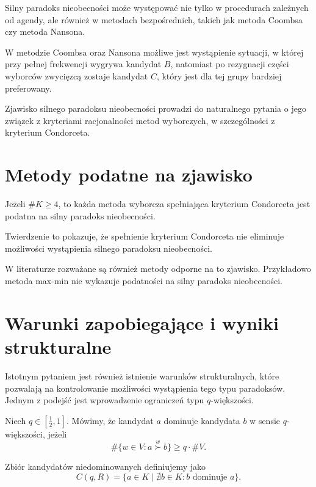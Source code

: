 \documentclass[12pt,a4paper]{mwrep}
\begin{document}
	\medskip
	
	Silny paradoks nieobecności może występować nie tylko w procedurach zależnych od agendy, ale również w metodach bezpośrednich, takich jak metoda Coombsa czy metoda Nansona.
	
	W metodzie Coombsa oraz Nansona możliwe jest wystąpienie sytuacji, w której przy pełnej frekwencji wygrywa kandydat \(B\), natomiast po rezygnacji części wyborców zwycięzcą zostaje kandydat \(C\), który jest dla tej grupy bardziej preferowany.
	
	\medskip
	
	Zjawisko silnego paradoksu nieobecności prowadzi do naturalnego pytania o jego związek z kryteriami racjonalności metod wyborczych, w szczególności z kryterium Condorceta.
	
	\section{Metody podatne na zjawisko}
	
	\begin{theorem}[Moulin]
		Jeżeli \(\#K \geq 4\), to każda metoda wyborcza spełniająca kryterium Condorceta jest podatna na silny paradoks nieobecności.
	\end{theorem}
	
	Twierdzenie to pokazuje, że spełnienie kryterium Condorceta nie eliminuje możliwości wystąpienia silnego paradoksu nieobecności.
	
	\medskip
	
	W literaturze rozważane są również metody odporne na to zjawisko. Przykładowo metoda max-min nie wykazuje podatności na silny paradoks nieobecności.
	
	\medskip
	
	\section{Warunki zapobiegające i wyniki strukturalne}
	
	Istotnym pytaniem jest również istnienie warunków strukturalnych, które pozwalają na kontrolowanie możliwości wystąpienia tego typu paradoksów. Jednym z podejść jest wprowadzenie ograniczeń typu \(q\)-większości.
	
	Niech \(q \in \left[\tfrac{1}{2},1\right]\). Mówimy, że kandydat \(a\) dominuje kandydata \(b\) w sensie \(q\)-większości, jeżeli
	\[
	\#\{w \in V : a \overset{w}{\succ} b\} \ge q \cdot \#V.
	\]
	
	Zbiór kandydatów niedominowanych definiujemy jako
	\[
	C(q,R) = \{a \in K \mid \nexists b \in K : b \text{ dominuje } a\}.
	\]
	
\end{document}
